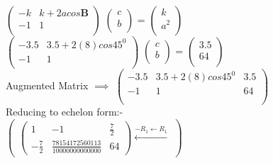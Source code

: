 \documentclass[10pt,a4paper]{report}
\newcommand{\myvec}[1]{\ensuremath{\begin{pmatrix}#1\end{pmatrix}}}
\let\vec\mathbf
\begin{document}
\begin{multicols}{2}
        $\begin{pmatrix}
            -k & k+2acos\vec{B}  \\
            -1 & 1  \\
        \end{pmatrix}$%
        $\begin{pmatrix}
            c \\
            b \\
        \end{pmatrix}$%
           =
           $\begin{pmatrix}
            k\\
            a^2\\
        \end{pmatrix}$%
        \vspace{5mm}           
   \\  
    $\begin{pmatrix}
            -3.5 & 3.5+2(8)cos45^0 \\
            -1 & 1  \\
        \end{pmatrix}$%
        $\begin{pmatrix}
            c \\
            b \\
        \end{pmatrix}$%
           =
           $\begin{pmatrix}
            3.5\\
            64\\
        \end{pmatrix}$%
        \vspace{5mm}           
   \\  
   Augmented Matrix $\implies$
   $\begin{pmatrix}
         -3.5 & 3.5+2(8)cos45^0 & 3.5\\
            -1 & 1  & 64\\
          \\
    \end{pmatrix}$%
    \\
    Reducing to echelon form:-
   \\
    $\begin{pmatrix}
    \myvec{1&-1&\frac{7}{2} \\ -\frac{7}{2}&\frac{78154172560113}{10000000000000}&64}
    \xleftarrow[]{-R_1 \leftarrow R_1}
    \end{pmatrix}$%
  \\
  \vspace{5mm}

\end{multicols}
\end{document}
